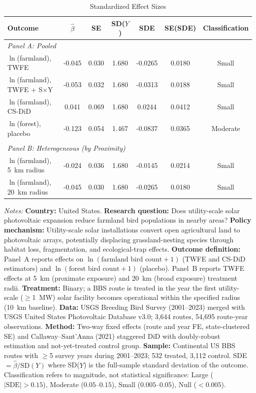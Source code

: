 \begin{table}[t]
\centering
\begin{threeparttable}
\caption{Standardized Effect Sizes}
\label{tab:sde}
\footnotesize
\begin{tabular}{lcccccc}
\toprule
Outcome & $\hat{\beta}$ & SE & SD($Y$) & SDE & SE(SDE) & Classification \\
\midrule
\multicolumn{7}{l}{\textit{Panel A: Pooled}} \\
$\ln$(farmland), TWFE & -0.045 & 0.030 & 1.680 & -0.0265 & 0.0180 & Small \\
$\ln$(farmland), TWFE + S$\times$Y & -0.053 & 0.032 & 1.680 & -0.0313 & 0.0188 & Small \\
$\ln$(farmland), CS-DiD & 0.041 & 0.069 & 1.680 & 0.0244 & 0.0412 & Small \\
$\ln$(forest), placebo & -0.123 & 0.054 & 1.467 & -0.0837 & 0.0365 & Moderate \\
\\[4pt]
\multicolumn{7}{l}{\textit{Panel B: Heterogeneous (by Proximity)}} \\
$\ln$(farmland), 5~km radius & -0.024 & 0.036 & 1.680 & -0.0145 & 0.0214 & Small \\
$\ln$(farmland), 20~km radius & -0.045 & 0.030 & 1.680 & -0.0265 & 0.0180 & Small \\
\bottomrule
\end{tabular}
\begin{tablenotes}[flushleft]\small
\item \textit{Notes:} \textbf{Country:} United States. \textbf{Research question:} Does utility-scale solar photovoltaic expansion reduce farmland bird populations in nearby areas? \textbf{Policy mechanism:} Utility-scale solar installations convert open agricultural land to photovoltaic arrays, potentially displacing grassland-nesting species through habitat loss, fragmentation, and ecological-trap effects. \textbf{Outcome definition:} Panel~A reports effects on $\ln(\text{farmland bird count}+1)$ (TWFE and CS-DiD estimators) and $\ln(\text{forest bird count}+1)$ (placebo). Panel~B reports TWFE effects at 5~km (proximate exposure) and 20~km (broad exposure) treatment radii. \textbf{Treatment:} Binary; a BBS route is treated in the year the first utility-scale ($\geq$1~MW) solar facility becomes operational within the specified radius (10~km baseline). \textbf{Data:} USGS Breeding Bird Survey (2001--2023) merged with USGS United States Photovoltaic Database v3.0; 3,644 routes, 54,695 route-year observations. \textbf{Method:} Two-way fixed effects (route and year FE, state-clustered SE) and Callaway--Sant'Anna (2021) staggered DiD with doubly-robust estimation and not-yet-treated control group. \textbf{Sample:} Continental US BBS routes with $\geq$5 survey years during 2001--2023; 532 treated, 3,112 control. SDE $= \hat{\beta} / \text{SD}(Y)$ where SD($Y$) is the full-sample standard deviation of the outcome. Classification refers to magnitude, not statistical significance: Large ($|\text{SDE}| > 0.15$), Moderate ($0.05$--$0.15$), Small ($0.005$--$0.05$), Null ($< 0.005$).
\end{tablenotes}
\end{threeparttable}
\end{table}

